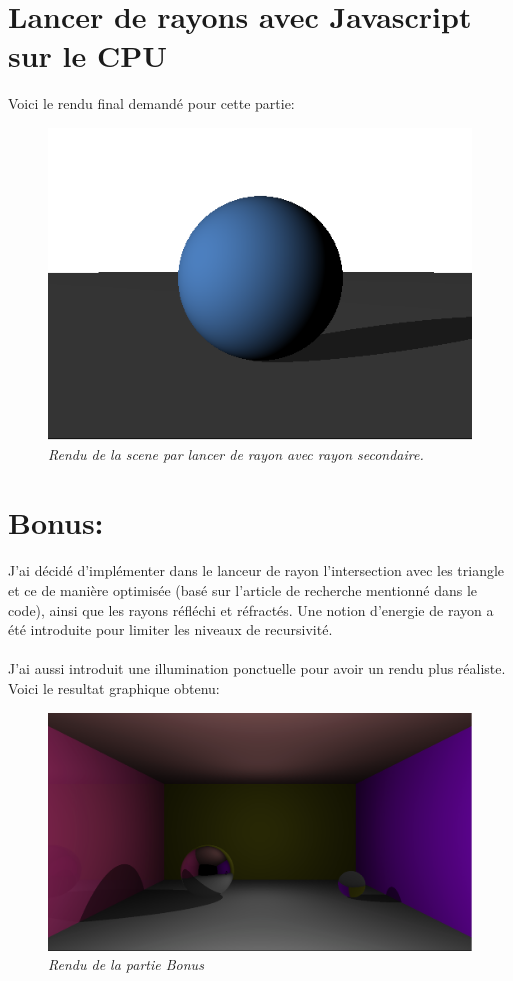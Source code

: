 \documentclass[12pt,letterpaper]{article}
\begin{document}
    \section{Lancer de rayons avec Javascript sur le CPU}

    Voici le rendu final demandé pour cette partie:

\begin{figure}[h!]
	\centering
	\includegraphics[scale=0.3]{images/ray.png}
	\caption{\textit{Rendu de la scene par lancer de rayon avec rayon secondaire.}}
\end{figure}
    \section{Bonus:}

	\setlength{\parindent}{1cm}
	J'ai décidé d'implémenter dans le lanceur de rayon l'intersection avec les triangle et ce de manière optimisée (basé sur l'article de recherche mentionné dans le code), ainsi que les rayons réfléchi et réfractés. Une notion d'energie de rayon a été introduite pour limiter les niveaux de recursivité.\\\\
	J'ai aussi introduit une illumination ponctuelle pour avoir un rendu plus réaliste.\\
	Voici le resultat graphique obtenu:\\
\begin{figure}[h!]
	\centering
	\includegraphics[scale=0.3]{images/extra.png}
	\caption{\textit{Rendu de la partie Bonus}}
\end{figure}

\newpage
    
\end{document}
